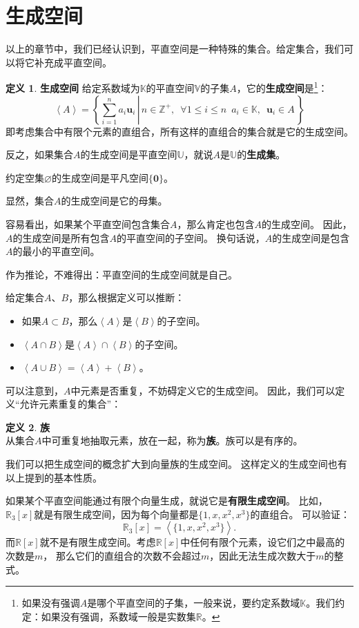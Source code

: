\documentclass[12pt,UTF8]{ctexbook}
\newcommand{\vect}[1]{\left\langle #1 \right\rangle}
\theoremstyle{definition}
\newtheorem{df}{定义}[section]
\theoremstyle{plain}
\begin{document}
\section{生成空间}
以上的章节中，我们已经认识到，平直空间是一种特殊的集合。给定集合，我们可以将它补充成平直空间。
\begin{df}{\textbf{生成空间}}
    给定系数域为$\mathbb{K}$的平直空间$\mathbb{V}$的子集$A$，它的\textbf{生成空间}是\footnote{如果没有强调$A$是哪个平直空间的子集，一般来说，要约定系数域$\mathbb{K}$。我们约定：如果没有强调，系数域一般是实数集$\mathbb{R}$。}：
    $$ \vect{A} = \left\{\left. \sum_{i=1}^n a_i \mathbf{u}_i \, \right| \, n\in\mathbb{Z}^+, \,\,\, \forall 1\leqslant i \leqslant n \,\,\, a_i \in \mathbb{K}, \,\,\, \mathbf{u}_i \in A\, \right\} $$
    即考虑集合中有限个元素的直组合，所有这样的直组合的集合就是它的生成空间。
    
    反之，如果集合$A$的生成空间是平直空间$\mathbb{U}$，就说$A$是$\mathbb{U}$的\textbf{生成集}。

    约定空集$\varnothing$的生成空间是平凡空间$\{\mathbf{0}\}$。
\end{df}

显然，集合$A$的生成空间是它的母集。

容易看出，如果某个平直空间包含集合$A$，那么肯定也包含$A$的生成空间。
因此，$A$的生成空间是所有包含$A$的平直空间的子空间。
换句话说，$A$的生成空间是包含$A$的最小的平直空间。

作为推论，不难得出：平直空间的生成空间就是自己。

给定集合$A$、$B$，那么根据定义可以推断：
\begin{itemize}
    \item 如果$A\subset B$，那么$\vect{A}$是$\vect{B}$的子空间。
    \item $\vect{A\cap B}$是$\vect{A}\cap\vect{B}$的子空间。
    \item $\vect{A\cup B} = \vect{A} + \vect{B}$。
\end{itemize}

可以注意到，$A$中元素是否重复，不妨碍定义它的生成空间。
因此，我们可以定义“允许元素重复的集合”：
\begin{df}{\textbf{族}}
    \mbox{} \\
    从集合$A$中可重复地抽取元素，放在一起，称为\textbf{族}。族可以是有序的。
\end{df}
我们可以把生成空间的概念扩大到向量族的生成空间。
这样定义的生成空间也有以上提到的基本性质。

如果某个平直空间能通过有限个向量生成，就说它是\textbf{有限生成空间}。
比如，$\mathbb{R}_3[x]$就是有限生成空间，因为每个向量都是$\{1, x, x^2, x^3\}$的直组合。
可以验证：
$$\mathbb{R}_3[x] = \vect{\{1, x, x^2, x^3\}}.$$
而$\mathbb{R}[x]$就不是有限生成空间。考虑$\mathbb{R}[x]$中任何有限个元素，设它们之中最高的次数是$m$，
那么它们的直组合的次数不会超过$m$，因此无法生成次数大于$m$的整式。
\end{document}
